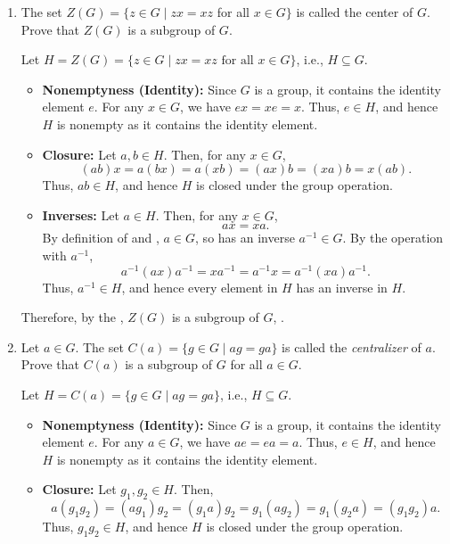 \begin{enumerate}
  \newpage
  \item The set $Z(G)=\{z \in G \mid z x=x z$ for all $x \in G\}$ is 
  called the center of $G$. Prove that $Z(G)$ is a subgroup of $G$.
  \begin{subprove}
    Let $H = Z(G) = \{z \in G \mid z x = x z \text{ for all } x \in G\}$, i.e., $H\subseteq G$.
    \begin{itemize}
      \item \textbf{Nonemptyness (Identity):} Since $G$ is a group, it contains the identity element $e$. 
      For any $x \in G$, we have $e x = x e = x$. 
      Thus, $e \in H$, and hence $H$ is nonempty as it contains the identity element.
      \item \textbf{Closure:} Let $a, b \in H$. 
      Then, for any $x \in G$,
      \[
        (a b) x = a (b x) = a (x b) = (a x) b = (x a) b = x (a b).
      \]
      Thus, $a b \in H$, and hence $H$ is closed under the group operation.
      \item \textbf{Inverses:} Let $a \in H$. 
      Then, for any $x \in G$,
      \[
        a x = x a.
      \]
      By definition of  and , 
      $a \in G$, so has an inverse $a^{-1} \in G$.
      By the operation with $a^{-1}$,
      \[
        a^{-1} (a x) a^{-1} =x a^{-1} = a^{-1} x= a^{-1} (x a) a^{-1}.
      \]
      Thus, $a^{-1} \in H$, and hence every element in $H$ has an inverse in $H$.
    \end{itemize}
    Therefore, by the , $Z(G)$ is a subgroup of $G$, .
  \end{subprove}
  \item Let $a \in G$. The set $C(a)=\{g \in G \mid a g=g a\}$ is called 
  the \textit{centralizer} of $a$. 
  Prove that $C(a)$ is a subgroup of $G$ for all $a \in G$.
  \begin{subprove}
    Let $H = C(a) = \{g \in G \mid a g = g a\}$, i.e., $H\subseteq G$.
    \begin{itemize}
      \item \textbf{Nonemptyness (Identity):} Since $G$ is a group, it contains the identity element $e$. 
      For any $a \in G$, we have $a e = e a = a$. 
      Thus, $e \in H$, and hence $H$ is nonempty as it contains the identity element.
      \item \textbf{Closure:} Let $g_1, g_2 \in H$. 
      Then, 
      \[
        a (g_1 g_2) = (a g_1) g_2 = (g_1 a) g_2 = g_1 (a g_2) = g_1 (g_2 a) = (g_1 g_2) a.
      \]
      Thus, $g_1 g_2 \in H$, and hence $H$ is closed under the group operation.

\end{itemize}
\end{subprove}
\end{enumerate}
